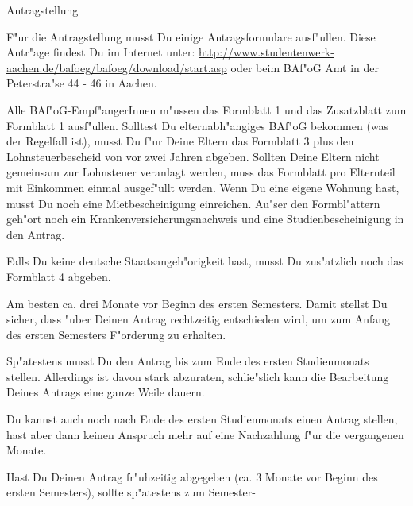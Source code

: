 \begin{artikel}{Antragstellung}

F"ur die Antragstellung musst Du einige Antragsformulare ausf"ullen. Diese Antr"age findest Du im Internet unter: \url{http://www.studentenwerk-aachen.de/bafoeg/bafoeg/download/start.asp} oder beim BAf"oG Amt in der Peterstra"se 44 - 46 in Aachen.

Alle BAf"oG-Empf"angerInnen m"ussen das Formblatt 1 und das Zusatzblatt zum Formblatt 1 ausf"ullen. Solltest Du elternabh"angiges BAf"oG bekommen (was der Regelfall ist), musst Du f"ur Deine Eltern das Formblatt 3 plus den Lohnsteuerbescheid von vor zwei Jahren abgeben. Sollten Deine Eltern nicht gemeinsam zur Lohnsteuer veranlagt werden, muss das Formblatt pro Elternteil mit Einkommen einmal ausgef"ullt werden. Wenn Du eine eigene Wohnung hast, musst Du noch eine Mietbescheinigung einreichen. Au"ser den Formbl"attern geh"ort noch ein Krankenversicherungsnachweis und eine Studienbescheinigung in den Antrag.

Falls Du keine deutsche Staatsangeh"origkeit hast, musst Du zus"atzlich noch das Formblatt 4 abgeben.

Am besten ca. drei Monate vor Beginn des ersten Semesters. Damit stellst Du sicher, dass "uber Deinen Antrag rechtzeitig entschieden wird, um zum Anfang des ersten Semesters F"orderung zu erhalten.

Sp"atestens musst Du den Antrag bis zum Ende des ersten Studienmonats stellen. Allerdings ist davon stark abzuraten, schlie"slich kann die Bearbeitung Deines Antrags eine ganze Weile dauern.

Du kannst auch noch nach Ende des ersten Studienmonats einen Antrag stellen, hast aber dann keinen Anspruch mehr auf eine Nachzahlung f"ur die vergangenen Monate.

Hast Du Deinen Antrag fr"uhzeitig abgegeben (ca. 3 Monate vor Beginn des ersten Semesters), sollte sp"atestens zum Semester-
\end{artikel}
